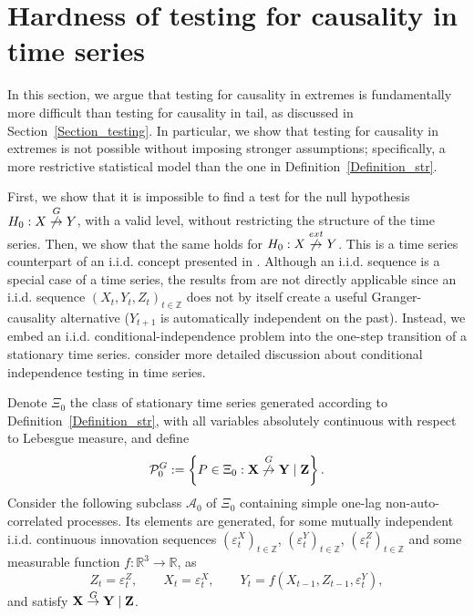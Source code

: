 \documentclass[a4paper,11pt]{article}
\newcommand{\toverset}[2]{\overset{{\rm #1}}{#2}}
\begin{document}
\newpage

\section{Hardness of testing for causality in time series}\label{s:HardnessTesting}
In this section, we argue that testing for causality in extremes is fundamentally more difficult than testing for causality in tail, as discussed in Section~\ref{Section_testing}. In particular, we show that testing for causality in extremes is not possible without imposing stronger assumptions; specifically, a more restrictive statistical model than the one in Definition~\ref{Definition_str}.

First, we show that it is impossible to find a test for the null hypothesis
$H_0: \textbf{X}\toverset{G}{\not\to}\textbf{Y}$, 
with a valid level, without restricting the structure of the time series. Then, we show that the same holds for $H_0: \textbf{X}\toverset{ext}{\not\to}\textbf{Y}$.  This is a time series counterpart of an i.i.d. concept presented in \cite{HARDNESS_OF_CONDITIONAL_TESTING}. Although an i.i.d. sequence is a special case of
a time series, the results from \cite{HARDNESS_OF_CONDITIONAL_TESTING} are not directly applicable since an i.i.d. sequence \((X_t,Y_t,Z_t)_{t\in\mathbb Z}\) does not by itself create a useful Granger-causality alternative ($Y_{t+1}$ is automatically independent on the past). Instead, we embed an i.i.d. conditional-independence problem into the one-step transition of a stationary time series. \cite{wiecksosa2026conditionalindependencetestingsingle} consider more detailed discussion about conditional independence testing in time series. 

Denote  \(\Xi_0\) the class of stationary time series generated according to Definition~\ref{Definition_str}, with all variables absolutely continuous with respect to Lebesgue measure, and define  
\[
    \mathcal P_0^G
    :=
    \left\{
        P\in\Xi_0:
        \mathbf X\toverset{G}{\not\to}\mathbf Y\mid\mathbf Z
    \right\}. 
\]
Consider the following subclass \(\mathcal A_0\) of \(\Xi_0\) containing  simple one-lag non-auto-correlated processes. Its elements are generated, for some mutually independent i.i.d. continuous innovation sequences \((\varepsilon^X_t)_{t\in\mathbb Z}\), \((\varepsilon^Y_t)_{t\in\mathbb Z}\), \((\varepsilon^Z_t)_{t\in\mathbb Z}\) and some measurable function \(f:\mathbb R^3\to\mathbb R\), as
\[
Z_t=\varepsilon^Z_t,\qquad    X_t=\varepsilon^X_t,\qquad  Y_t=f(X_{t-1}, Z_{t-1}, \varepsilon^Y_t),
\]
and satisfy \(\mathbf X\toverset{G}{\to}\mathbf Y\mid\mathbf Z\). 
\end{document}
